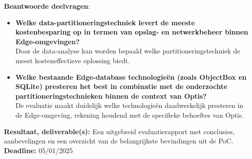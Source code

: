     \textbf{Beantwoorde deelvragen}:
    \begin{itemize}
    \item \textbf{Welke data-partitioneringstechniek levert de meeste kostenbesparing op in termen van opslag- en netwerkbeheer binnen \vspace{0em}\\ Edge-omgevingen?} \\
      Door de data-analyse kan worden bepaald welke partitioneringstechniek de meest kosteneffectieve oplossing biedt.
    \item \textbf{Welke bestaande Edge-database technologieën (zoals ObjectBox en SQLite) presteren het best in combinatie met de onderzochte partitioneringstechnieken binnen de context van Optis?} \\
      De evaluatie maakt duidelijk welke technologieën daadwerkelijk presteren in de Edge-omgeving, rekening houdend met de specifieke behoeftes van Optis.
    \end{itemize}
    \textbf{Resultaat, deliverable(s):} Een uitgebreid evaluatierapport met conclusies, aanbevelingen en een overzicht van de belangrijkste bevindingen uit de PoC.\newline\newline
    \textbf{Deadline:} 05/01/2025\newline\newline